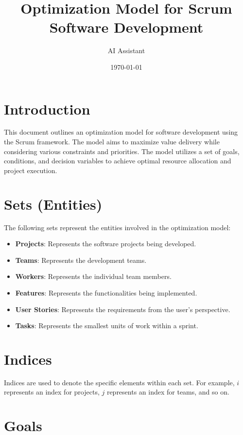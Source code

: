 \documentclass{article}
\title{Optimization Model for Scrum Software Development}
\author{AI Assistant}
\date{\today}
\begin{document}
\maketitle

\tableofcontents

\section{Introduction}

This document outlines an optimization model for software development using the Scrum framework. The model aims to maximize value delivery while considering various constraints and priorities.  The model utilizes a set of goals, conditions, and decision variables to achieve optimal resource allocation and project execution.

\section{Sets (Entities)}

The following sets represent the entities involved in the optimization model:

\begin{itemize}
    \item \textbf{Projects}: Represents the software projects being developed.
    \item \textbf{Teams}: Represents the development teams.
    \item \textbf{Workers}: Represents the individual team members.
    \item \textbf{Features}: Represents the functionalities being implemented.
    \item \textbf{User Stories}: Represents the requirements from the user's perspective.
    \item \textbf{Tasks}: Represents the smallest units of work within a sprint.
\end{itemize}

\section{Indices}

Indices are used to denote the specific elements within each set.  For example, $i$ represents an index for projects, $j$ represents an index for teams, and so on.

\section{Goals}
\end{document}
